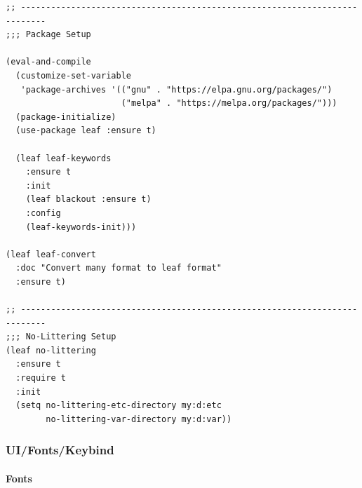 \documentclass[11pt]{article}
\begin{document}
\begin{verbatim}
;; ---------------------------------------------------------------------------
;;; Package Setup

(eval-and-compile
  (customize-set-variable
   'package-archives '(("gnu" . "https://elpa.gnu.org/packages/")
                       ("melpa" . "https://melpa.org/packages/")))
  (package-initialize)
  (use-package leaf :ensure t)

  (leaf leaf-keywords
    :ensure t
    :init
    (leaf blackout :ensure t)
    :config
    (leaf-keywords-init)))

(leaf leaf-convert
  :doc "Convert many format to leaf format"
  :ensure t)

;; ---------------------------------------------------------------------------
;;; No-Littering Setup
(leaf no-littering
  :ensure t
  :require t
  :init
  (setq no-littering-etc-directory my:d:etc
        no-littering-var-directory my:d:var))
\end{verbatim}
\subsubsection{UI/Fonts/Keybind}
\label{sec:org1e4ed2e}
\paragraph{Fonts}
\label{sec:org6e5f85d}
\end{document}
